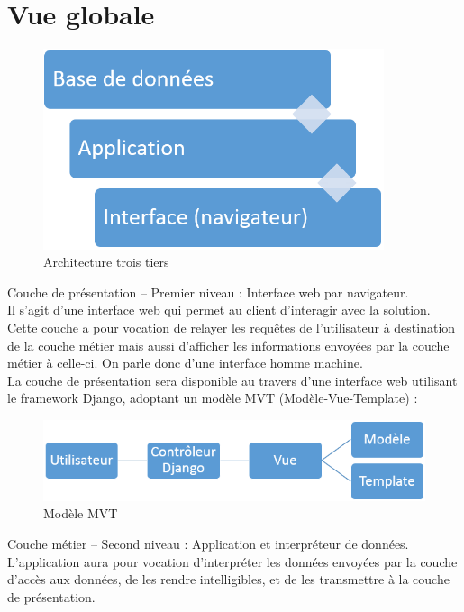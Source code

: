 \section{Vue globale}

\begin{figure}[H]
  \caption{Architecture trois tiers}
  \centering
  \vspace*{0.5cm}
  \includegraphics[width=10cm]{implem_1.png}
\end{figure}
Couche de présentation – Premier niveau : Interface web par navigateur.\\
Il s’agit d’une interface web qui permet au client d’interagir avec la solution.\\
Cette couche a pour vocation de relayer les requêtes de l’utilisateur à destination de la couche métier mais aussi d’afficher les informations envoyées par la couche métier à celle-ci. On parle donc d’une interface homme machine.\\
La couche de présentation sera disponible au travers d’une interface web utilisant le framework Django, adoptant un modèle MVT (Modèle-Vue-Template) :\\
\begin{figure}[H]
  \caption{Modèle MVT}
  \centering
  \vspace*{0.5cm}
  \includegraphics[width=15cm]{implem_2.png}
\end{figure}
\noindent
Couche métier – Second niveau : Application et interpréteur de données.\\
L’application aura pour vocation d’interpréter les données envoyées par la couche d’accès aux données, de les rendre intelligibles, et de les transmettre à la couche de présentation.\\
